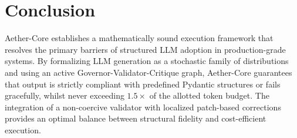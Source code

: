 \documentclass[10pt,journal,compsoc]{IEEEtran}
\begin{document}
\section{Conclusion}
Aether-Core establishes a mathematically sound execution framework that resolves the primary barriers of structured LLM adoption in production-grade systems. By formalizing LLM generation as a stochastic family of distributions and using an active Governor-Validator-Critique graph, Aether-Core guarantees that output is strictly compliant with predefined Pydantic structures or fails gracefully, whilst never exceeding $1.5\times$ of the allotted token budget. The integration of a non-coercive validator with localized patch-based corrections provides an optimal balance between structural fidelity and cost-efficient execution.
\end{document}

